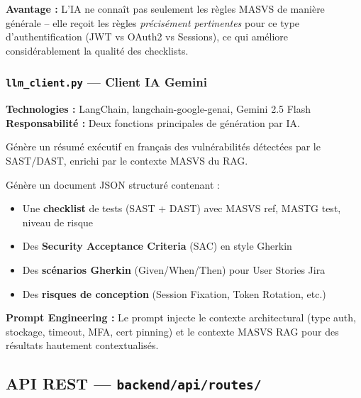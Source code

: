 \documentclass[12pt,a4paper,french]{article}
\newcommand{\file}[1]{\textcolor{primary}{\texttt{#1}}}
\begin{document}
\textbf{Avantage :} L'IA ne connaît pas seulement les règles MASVS de manière générale
-- elle reçoit les règles \textit{précisément pertinentes} pour ce type d'authentification
(JWT vs OAuth2 vs Sessions), ce qui améliore considérablement la qualité des checklists.

\subsubsection{\file{llm\_client.py} — Client IA Gemini}

\begin{tcolorbox}[toolbox, title={Rôle : Interface unifiée avec l'IA Google Gemini}]
\textbf{Technologies :} LangChain, langchain-google-genai, Gemini 2.5 Flash\\
\textbf{Responsabilité :} Deux fonctions principales de génération par IA.
\end{tcolorbox}

\begin{description}[leftmargin=2cm, style=nextline]
  \item[\texttt{generate\_executive\_summary()}]
    Génère un résumé exécutif en français des vulnérabilités détectées par le SAST/DAST,
    enrichi par le contexte MASVS du RAG.

  \item[\texttt{generate\_auth\_checklist()}]
    Génère un document JSON structuré contenant :
    \begin{itemize}
      \item Une \textbf{checklist} de tests (SAST + DAST) avec MASVS ref, MASTG test, niveau de risque
      \item Des \textbf{Security Acceptance Criteria} (SAC) en style Gherkin
      \item Des \textbf{scénarios Gherkin} (Given/When/Then) pour User Stories Jira
      \item Des \textbf{risques de conception} (Session Fixation, Token Rotation, etc.)
    \end{itemize}
\end{description}

\textbf{Prompt Engineering :} Le prompt injecte le contexte architectural (type auth,
stockage, timeout, MFA, cert pinning) et le contexte MASVS RAG pour des résultats
hautement contextualisés.

\subsection{API REST — \file{backend/api/routes/}}
\end{document}
